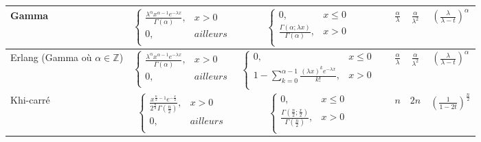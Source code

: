 \documentclass[10pt, french]{article}
\begin{document}
\begin{tabularx}{\textwidth}{ | Y | c | c | c | c | c | c  |}
Gamma & $
 \left\{
    	\begin{array}{ll}
    		\frac{\lambda^{\alpha} x^{\alpha - 1} e^{-\lambda x}}{\Gamma (\alpha)}, &  x > 0 \\
    		0,  &  ailleurs \\
    	\end{array}
    \right.
    $& $
	\left\{
    	\begin{array}{ll}
		0, & x \le 0 \\
		\frac{\Gamma(\alpha; \lambda x)}{\Gamma (\alpha)}, &  x > 0 \\
    	\end{array}
    \right.$
	& 
	& $\frac{\alpha}{\lambda}$
	& $\frac{\alpha}{\lambda^2}$
	& $\left(\frac{\lambda}{\lambda - t}\right)^\alpha$ \\ 
\hline

Erlang (Gamma où $\alpha \in \mathbb{Z} $) & $
 \left\{
    	\begin{array}{ll}
    		\frac{\lambda^{\alpha} x^{\alpha - 1} e^{-\lambda x}}{\Gamma (\alpha)}, &  x > 0 \\
    		0,  &  ailleurs \\
    	\end{array}
    \right.
    $& $
	\left\{
    	\begin{array}{ll}
		0, & x \le 0 \\
		1 - \sum_{k=0}^{\alpha - 1} \frac{(\lambda x)^k e^{- \lambda x}}{k!}, &  x > 0 \\
    	\end{array}
    \right.$
	& 
	& $\frac{\alpha}{\lambda}$
	& $\frac{\alpha}{\lambda^2}$
	& $\left(\frac{\lambda}{\lambda - t}\right)^\alpha$ \\ 
\hline

 Khi-carré & $
 \left\{
    	\begin{array}{ll}
    		\frac{ x^{\frac{n}{2} - 1} e^{-\frac{x}{2}}}{2^{\frac{n}{2}} \Gamma \left(\frac{n}{2}\right)}, &  x > 0 \\
    		0,  &  ailleurs \\
    	\end{array}
    \right.
    $&$
	\left\{
    	\begin{array}{ll}
		0, & x \le 0 \\
		\frac{\Gamma\left(\frac{n}{2}; \frac{x}{2}\right)}{\Gamma \left(\frac{n}{2}\right)}, &  x > 0 \\
    	\end{array}
    \right.$
	& 
	& $n$
	& $2n$
	& $\left(\frac{1}{1- 2t}\right)^{\frac{n}{2}}$ \\ 
\hline


\end{tabularx}
\end{document}
